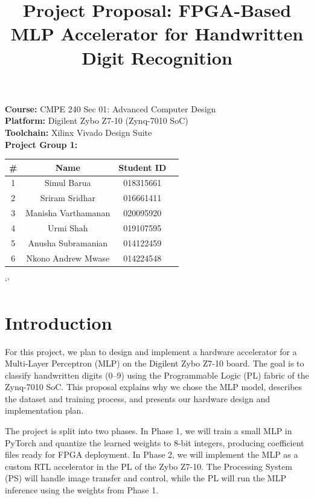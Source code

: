 \documentclass[12pt, letterpaper]{article}
\title{\textbf{Project Proposal: FPGA-Based MLP Accelerator for Handwritten Digit Recognition}\\[6pt]}
\date{}
\begin{document}
\maketitle

\begin{center}
\textbf{Course:} CMPE 240 Sec 01: Advanced Computer Design\\[10pt]
\textbf{Platform:} Digilent Zybo Z7-10 (Zynq-7010 SoC)\\[10pt]
\textbf{Toolchain:} Xilinx Vivado Design Suite\\[16pt]
\textbf{Project Group 1:}\\[6pt]
\begin{tabular}{cccc}
\toprule
\textbf{\#} & \textbf{Name} & \textbf{Student ID} \\
\midrule
1 & Simul Barua & 018315661 \\[6pt]
2 & Sriram Sridhar & 016661411 \\[6pt]
3 & Manisha Varthamanan & 020095920 \\[6pt]
4 & Urmi Shah & 019107595 \\[6pt]
5 & Anusha Subramanian & 014122459 \\[6pt]
6 & Nkono Andrew Mwase & 014224548 \\
\bottomrule
\end{tabular}
\end{center}

\bigskip\bigskip
`'
\newpage
\section{Introduction}

For this project, we plan to design and implement a hardware accelerator for a
Multi-Layer Perceptron (MLP) on the Digilent Zybo Z7-10 board. The goal is to
classify handwritten digits (0--9) using the Programmable Logic (PL) fabric of
the Zynq-7010 SoC. This proposal explains why we chose the MLP model, describes
the dataset and training process, and presents our hardware design and implementation
plan.

The project is split into two phases. In Phase 1, we will train a small MLP in PyTorch
and quantize the learned weights to 8-bit integers, producing coefficient files
ready for FPGA deployment. In Phase 2, we will implement the MLP as a custom RTL accelerator
in the PL of the Zybo Z7-10. The Processing System (PS) will handle image
transfer and control, while the PL will run the MLP inference using the weights from Phase 1.\\[4pt]
\end{document}
